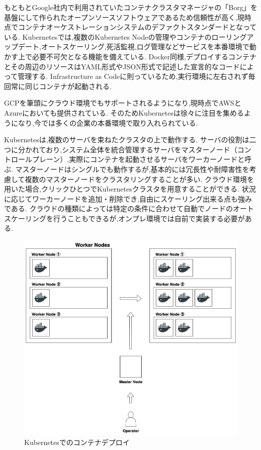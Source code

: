 もともとGoogle社内で利用されていたコンテナクラスタマネージャの「Borg」を基盤にして作られたオープンソースソフトウェアであるため信頼性が高く,現時点でコンテナオーケストレーションシステムのデファクトスタンダードとなっている.
Kubernetesでは,複数のKubernetes Nodeの管理やコンテナのローリングアップデート,オートスケーリング,死活監視,ログ管理などサービスを本番環境で動かす上で必要不可欠となる機能を備えている.
Docker同様,デプロイするコンテナとその周辺のリソースはYAML形式やJSON形式で記述した宣言的なコードによって管理する.
Infrastructure as Codeに則っているため,実行環境に左右されず毎回常に同じコンテナが起動される.

GCPを筆頭にクラウド環境でもサポートされるようになり,現時点でAWSとAzureにおいても提供されている.
そのためKubernetesは徐々に注目を集めるようになり,今では多くの企業の本番環境で取り入れられている.

Kubernetesは,複数のサーバを束ねたクラスタの上で動作する.
サーバの役割は二つに分かれており,システム全体を統合管理するサーバをマスターノード（コントロールプレーン）,実際にコンテナを起動させるサーバをワーカーノードと呼ぶ.
マスターノードはシングルでも動作するが,基本的には冗長性や耐障害性を考慮して複数のマスターノードをクラスタリングすることが多い.
クラウド環境を用いた場合,クリックひとつでKubernetesクラスタを用意することができる.
状況に応じてワーカーノードを追加・削除でき,自由にスケーリング出来る点も強みである.
クラウドの種類によっては特定の条件に合わせて自動でノードのオートスケーリングを行うこともできるが,オンプレ環境では自前で実装する必要がある.

\begin{figure}[htbp]
\begin{center}
    \includegraphics[width=\textwidth]{./figures/k8s-deploy-container.jpg}
    \caption{Kubernetesでのコンテナデプロイ}
\end{center}
\end{figure}

